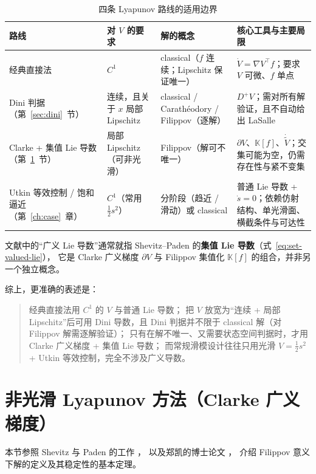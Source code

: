 \begin{table}[!htb]
  \centering
  \footnotesize
  \setlength{\tabcolsep}{4pt}
  \begin{tabular}{@{}p{2.5cm}|p{3.4cm}|p{4.0cm}|p{3.8cm}@{}}
    \hline
    路线 & 对 $V$ 的要求 & 解的概念 & 核心工具与主要局限 \\
    \hline
    经典直接法 & $C^1$ & classical（$f$ 连续；Lipschitz 保证唯一） & $\dot V=\nabla V^\top f$；要求 $V$ 可微、$f$ 单点 \\
    \hline
    Dini 判据（第~\ref{sec:dini}~节） & 连续，且关于 $x$ 局部 Lipschitz & classical / Carathéodory / Filippov（逐解） & $D^+V$；需对所有解验证，且不自动给出 LaSalle \\
    \hline
    Clarke + 集值 Lie 导数（第~\ref{sec:clarke}~节） & 局部 Lipschitz（可非光滑） & Filippov（解可不唯一） & $\partial V$、$\mathbb{K}[f]$、$\dot{\tilde V}$；交集可能为空，仍需存在性与紧不变集 \\
    \hline
    Utkin 等效控制 / 饱和逼近（第~\ref{ch:case}~章） & $C^1$（常用 $\frac12s^2$） & 分阶段（趋近 / 滑动）或 classical & 普通 Lie 导数 + $\dot s=0$；依赖仿射结构、单光滑面、横截条件与可达性 \\
    \hline
  \end{tabular}
  \caption{四条 Lyapunov 路线的适用边界}
  \label{tab:tool-scope}
\end{table}

\begin{remark}[术语]
  文献中的“广义 Lie 导数”通常就指 Shevitz--Paden 的\textbf{集值 Lie 导数}（式~\eqref{eq:set-valued-lie}），
  它是 Clarke 广义梯度 $\partial V$ 与 Filippov 集值化 $\mathbb{K}[f]$ 的组合，并非另一个独立概念。
\end{remark}

综上，更准确的表述是：
\begin{quote}
经典直接法用 $C^1$ 的 $V$ 与普通 Lie 导数；
把 $V$ 放宽为“连续 + 局部 Lipschitz”后可用 Dini 导数，且 Dini 判据并不限于 classical 解（对 Filippov 解需逐解验证）；
只有在解不唯一、又需要状态空间判据时，才用 Clarke 广义梯度 + 集值 Lie 导数；
而常规滑模设计往往只用光滑 $V=\frac12s^2$ + Utkin 等效控制，完全不涉及广义导数。
\end{quote}

\section{非光滑 Lyapunov 方法（Clarke 广义梯度）}\label{sec:clarke}

本节参照 Shevitz 与 Paden 的工作 \cite{shevitzLyapunovStabilityTheory1994}，
以及郑凯的博士论文 \cite{郑凯_基于Filippov微分包含解的非平滑控制系统}，
介绍 Filippov 意义下解的定义及其稳定性的基本定理。

